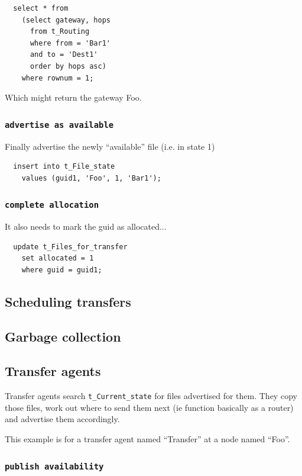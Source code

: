 \documentclass{cmspaper}
\begin{document}
{\small\begin{verbatim}
  select * from
    (select gateway, hops
      from t_Routing
      where from = 'Bar1'
      and to = 'Dest1'
      order by hops asc)
    where rownum = 1;
\end{verbatim}}

Which might return the gateway Foo. 

\subsubsection{\textbf{\texttt{advertise as available}}}
Finally advertise the newly ``available'' file (i.e. in state 1)

{\small\begin{verbatim}
  insert into t_File_state
    values (guid1, 'Foo', 1, 'Bar1');
\end{verbatim}}

\subsubsection{\textbf{\texttt{complete allocation}}}
It also needs to mark the guid as allocated...

{\small\begin{verbatim}
  update t_Files_for_transfer 
    set allocated = 1
    where guid = guid1;
\end{verbatim}}

\subsection{Scheduling transfers}

\subsection{Garbage collection}

\subsection{Transfer agents}

Transfer agents search \texttt{t\_Current\_state} for files advertised for them.  They copy those files, work out where to send them next (ie function basically as a router) and advertise them accordingly. 

This example is for a transfer agent named ``Transfer'' at a node named ``Foo''.

\subsubsection{\textbf{\texttt{publish availability}}}
\end{document}
